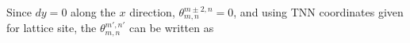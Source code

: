 \documentclass{report}
\begin{document}
\noindent Since $dy = 0$ along the $x$ direction, $\theta_{m,n}^{m \pm 2, n} = 0$, and using \ac{TNN} coordinates given for lattice site, the $\theta_{m,n}^{m',n'}$ can be written as
\end{document}

